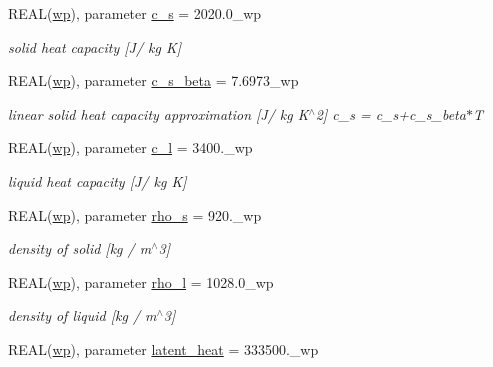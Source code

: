 \begin{DoxyCompactItemize}
REAL(\hyperlink{namespacemo__parameters_a41be20bed1dcec244405328deaaffe30}{wp}), parameter \hyperlink{namespacemo__parameters_ab81b5df9bf526e14b97f78bcf35019bf}{c\_\-s} = 2020.0\_\-wp
\begin{DoxyCompactList}\small\item\em solid heat capacity \mbox{[}J/ kg K\mbox{]} \item\end{DoxyCompactList}\item 
REAL(\hyperlink{namespacemo__parameters_a41be20bed1dcec244405328deaaffe30}{wp}), parameter \hyperlink{namespacemo__parameters_a9e6e68ac08c908458ac6e50a72e66ad9}{c\_\-s\_\-beta} = 7.6973\_\-wp
\begin{DoxyCompactList}\small\item\em linear solid heat capacity approximation \mbox{[}J/ kg K$^\wedge$2\mbox{]} c\_\-s = c\_\-s+c\_\-s\_\-beta$\ast$T \item\end{DoxyCompactList}\item 
REAL(\hyperlink{namespacemo__parameters_a41be20bed1dcec244405328deaaffe30}{wp}), parameter \hyperlink{namespacemo__parameters_a53f3c50306e6d9fb7928aacdd48d9776}{c\_\-l} = 3400.\_\-wp
\begin{DoxyCompactList}\small\item\em liquid heat capacity \mbox{[}J/ kg K\mbox{]} \item\end{DoxyCompactList}\item 
REAL(\hyperlink{namespacemo__parameters_a41be20bed1dcec244405328deaaffe30}{wp}), parameter \hyperlink{namespacemo__parameters_a7923c17c60cfcf6ce245f84e5c4aae3d}{rho\_\-s} = 920.\_\-wp
\begin{DoxyCompactList}\small\item\em density of solid \mbox{[}kg / m$^\wedge$3\mbox{]} \item\end{DoxyCompactList}\item 
REAL(\hyperlink{namespacemo__parameters_a41be20bed1dcec244405328deaaffe30}{wp}), parameter \hyperlink{namespacemo__parameters_a7c9d4f55d958561511f30542576af730}{rho\_\-l} = 1028.0\_\-wp
\begin{DoxyCompactList}\small\item\em density of liquid \mbox{[}kg / m$^\wedge$3\mbox{]} \item\end{DoxyCompactList}\item 
REAL(\hyperlink{namespacemo__parameters_a41be20bed1dcec244405328deaaffe30}{wp}), parameter \hyperlink{namespacemo__parameters_ad2928a0d789eeb0407ec6f3756075a18}{latent\_\-heat} = 333500.\_\-wp

\end{DoxyCompactItemize}
